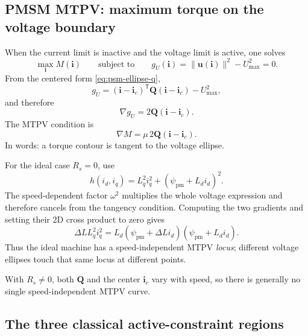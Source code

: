 \documentclass[11pt,a4paper]{article}
\newcommand{\id}{i_d}
\newcommand{\iq}{i_q}
\newcommand{\Rs}{R_s}
\newcommand{\Ld}{L_d}
\newcommand{\Lq}{L_q}
\newcommand{\psipm}{\psi_{\mathrm{pm}}}
\newcommand{\Umax}{U_{\max}}
\newcommand{\T}{\mathsf{T}}
\newcommand{\vct}[1]{\bm{#1}}
\newcommand{\mat}[1]{\bm{#1}}
\begin{document}
\subsection{PMSM MTPV: maximum torque on the voltage boundary}

When the current limit is inactive and the voltage limit is active, one solves
\begin{equation}
  \max_{\vct i} M(\vct i)
  \qquad\text{subject to}\qquad
  g_U(\vct i)=\|\vct u(\vct i)\|^2-\Umax^2=0.
  \label{eq:mtpv-problem}
\end{equation}
From the centered form \eqref{eq:psm-ellipse-q},
\begin{equation}
  g_U=(\vct i-\vct i_c)^\T\mat Q(\vct i-\vct i_c)-\Umax^2,
\end{equation}
and therefore
\begin{equation}
  \nabla g_U=2\mat Q(\vct i-\vct i_c).
  \label{eq:grad-voltage-q}
\end{equation}
The MTPV condition is
\begin{equation}
  \boxed{
  \nabla M=\mu\,2\mat Q(\vct i-\vct i_c).
  }
  \label{eq:mtpv-general}
\end{equation}
In words: a torque contour is tangent to the voltage ellipse.

For the ideal case $\Rs=0$, use
\begin{equation}
  h(\id,\iq)=\Lq^2\iq^2+(\psipm+\Ld\id)^2.
\end{equation}
The speed-dependent factor $\omega^2$ multiplies the whole voltage expression and therefore cancels from the tangency condition. Computing the two gradients and setting their 2D cross product to zero gives
\begin{equation}
  \boxed{
  \Delta L\Lq^2\iq^2
  =\Ld(\psipm+\Delta L\id)(\psipm+\Ld\id).
  }
  \label{eq:ideal-mtpv-locus}
\end{equation}
Thus the ideal machine has a speed-independent MTPV \emph{locus}; different voltage ellipses touch that same locus at different points.

With $\Rs\neq0$, both $\mat Q$ and the center $\vct i_c$ vary with speed, so there is generally no single speed-independent MTPV curve.

\subsection{The three classical active-constraint regions}
\end{document}
